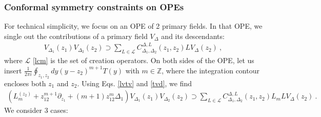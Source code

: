 \documentclass[12pt, a4paper]{article}
\begin{document}
\subsubsection{Conformal symmetry constraints on OPEs}\label{sec:csope}

For technical simplicity, we focus on an OPE of 2 primary fields. In that OPE, we single out the contributions of a primary field $V_\Delta$ and its descendants:
\begin{align}
 V_{\Delta_1}(z_1)V_{\Delta_2}(z_2) \supset \sum_{L\in \mathcal{L}} C_{\Delta_1,\Delta_2}^{\Delta, L}(z_1,z_2) LV_\Delta(z_2) \ ,
\end{align}
where $\mathcal{L}$ \eqref{lcm} is the set of creation operators. On both sides of the OPE, let us insert $\frac{1}{2\pi i}\oint_{z_1,z_2} dy (y-z_2)^{m+1}T(y)$ with $m\in\mathbb{Z}$, where the integration contour encloses both $z_1$ and $z_2$. Using Eqs. \eqref{lvtv} and \eqref{tvd}, we find
\begin{align}
 \left(L_m^{(z_2)} +z_{12}^{m+1}\partial_{z_1} + (m+1)z_{12}^m\Delta_1\right) V_{\Delta_1}(z_1)V_{\Delta_2}(z_2) \supset \sum_{L\in \mathcal{L}} C_{\Delta_1,\Delta_2}^{\Delta, L}(z_1,z_2)L_mLV_\Delta(z_2) \ .
 \label{lmope}
\end{align}
We consider 3 cases:
\end{document}
